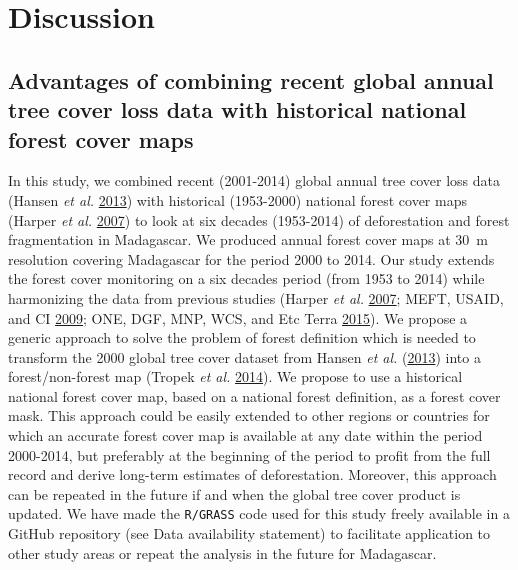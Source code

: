 \documentclass[]{article}
\theoremstyle{definition}
\theoremstyle{definition}
\theoremstyle{definition}
\theoremstyle{remark}
\begin{document}
\hypertarget{discussion}{%
\section{Discussion}\label{discussion}}

\hypertarget{advantages-of-combining-recent-global-annual-tree-cover-loss-data-with-historical-national-forest-cover-maps}{%
\subsection{Advantages of combining recent global annual tree cover loss
data with historical national forest cover
maps}\label{advantages-of-combining-recent-global-annual-tree-cover-loss-data-with-historical-national-forest-cover-maps}}

In this study, we combined recent (2001-2014) global annual tree cover
loss data (Hansen \emph{et al.}
\protect\hyperlink{ref-Hansen2013}{2013}) with historical (1953-2000)
national forest cover maps (Harper \emph{et al.}
\protect\hyperlink{ref-Harper2007}{2007}) to look at six decades
(1953-2014) of deforestation and forest fragmentation in Madagascar. We
produced annual forest cover maps at 30~m resolution covering Madagascar
for the period 2000 to 2014. Our study extends the forest cover
monitoring on a six decades period (from 1953 to 2014) while harmonizing
the data from previous studies (Harper \emph{et al.}
\protect\hyperlink{ref-Harper2007}{2007}; MEFT, USAID, and CI
\protect\hyperlink{ref-MEFT2009}{2009}; ONE, DGF, MNP, WCS, and Etc
Terra \protect\hyperlink{ref-ONE2015}{2015}). We propose a generic
approach to solve the problem of forest definition which is needed to
transform the 2000 global tree cover dataset from Hansen \emph{et al.}
(\protect\hyperlink{ref-Hansen2013}{2013}) into a forest/non-forest map
(Tropek \emph{et al.} \protect\hyperlink{ref-Tropek2014}{2014}). We
propose to use a historical national forest cover map, based on a
national forest definition, as a forest cover mask. This approach could
be easily extended to other regions or countries for which an accurate
forest cover map is available at any date within the period 2000-2014,
but preferably at the beginning of the period to profit from the full
record and derive long-term estimates of deforestation. Moreover, this
approach can be repeated in the future if and when the global tree cover
product is updated. We have made the \texttt{R/GRASS} code used for this
study freely available in a GitHub repository (see Data availability
statement) to facilitate application to other study areas or repeat the
analysis in the future for Madagascar.
\end{document}
